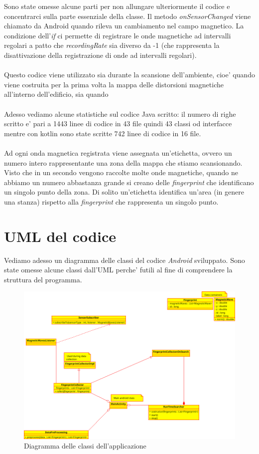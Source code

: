 Sono state omesse alcune parti per non allungare ulteriormente il codice e concentrarci sulla parte essenziale della classe. Il metodo \textit{onSensorChanged} viene chiamato da Android quando rileva un cambiamento nel campo magnetico. La condizione dell'\textit{if} ci permette di registrare le onde magnetiche ad intervalli regolari a patto che \textit{recordingRate} sia diverso da -1 (che rappresenta la  disattivazione della registrazione di onde ad intervalli regolari).
\\\\
Questo codice viene utilizzato sia durante la scansione dell'ambiente, cioe' quando viene costruita per la prima volta la mappa delle distorsioni magnetiche all'interno dell'edificio, sia quando 
\\\\
Adesso vediamo alcune statistiche sul codice Java scritto: il numero di righe scritto e' pari a 1443 linee di codice in 43 file quindi 43 classi od interfacce mentre con kotlin sono state scritte 742 linee di codice in 16 file.
\\\\
Ad ogni onda magnetica registrata viene assegnata un'etichetta, ovvero un numero intero rappresentante una zona della mappa che stiamo scansionando. Visto che in un secondo vengono raccolte molte onde magnetiche, quando ne abbiamo un numero abbastanza grande si creano delle \textit{fingerprint} che identificano un singolo punto della zona. Di solito un'etichetta identifica un'area (in genere una stanza) rispetto alla \textit{fingerprint} che rappresenta un singolo punto.


\section{UML del codice}
Vediamo adesso un diagramma delle classi del codice \textit{Android} sviluppato. Sono state omesse alcune classi dall'UML perche' futili al fine di comprendere la struttura del programma.

\begin{figure}[H]
	\centering
	\includegraphics[width=1\linewidth]{img/class_diagram}
	\caption{Diagramma delle classi dell'applicazione}
	\label{fig:classdiagram}
\end{figure}


